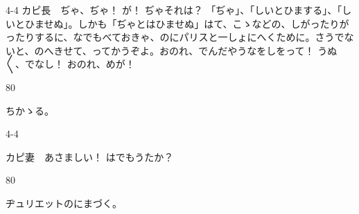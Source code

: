 \documentclass[tate,paper=b6j,jafontsize=9pt]{jlreq}
\begin{document}
\begin{azconvIndented}{4\zw}{-4\zw}
カピ長　ぢゃ、ぢゃ！ が！ ぢゃそれは？ 「ぢゃ」、「しいとひまする」、「しいとひませぬ」。しかも「ぢゃとはひませぬ」はて、こゝなどの、しがったりがったりするに、なでもべておきゃ、のにパリスと一しょにへくために。さうでないと、のへきせて、ってかうぞよ。おのれ、でんだやうなをしをって！ うぬ{〳〵}、でなし！ おのれ、めが！

\end{azconvIndented}
\begin{azconvIndented}{8\zw}{0\zw}

ちかゝる。

\end{azconvIndented}
\begin{azconvIndented}{4\zw}{-4\zw}

カピ妻　あさましい！ はでもうたか？

\end{azconvIndented}
\begin{azconvIndented}{8\zw}{0\zw}

ヂュリエットのにまづく。

\end{azconvIndented}
\end{document}
